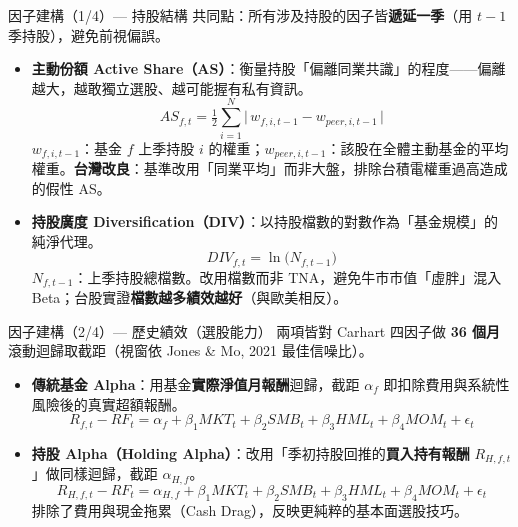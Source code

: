\documentclass[aspectratio=169,11pt,t]{beamer}   %
\begin{document}
\begin{frame}{因子建構（1/4）— 持股結構}
\vspace{-0.05cm}\small
共同點：所有涉及持股的因子皆\textbf{遞延一季}（用 $t{-}1$ 季持股），避免前視偏誤。
\begin{itemize}\setlength{\itemsep}{8pt}
  \item \textcolor{nccublue}{\textbf{主動份額 Active Share（AS）}}：衡量持股「偏離同業共識」的程度——偏離越大，越敢獨立選股、越可能握有私有資訊。
  \[ AS_{f,t}=\tfrac{1}{2}\sum_{i=1}^{N}\bigl|\,w_{f,i,t-1}-w_{peer,i,t-1}\,\bigr| \]
  {\footnotesize\color{softgray} $w_{f,i,t-1}$：基金 $f$ 上季持股 $i$ 的權重；$w_{peer,i,t-1}$：該股在全體主動基金的平均權重。\textbf{台灣改良}：基準改用「同業平均」而非大盤，排除台積電權重過高造成的假性 AS。}
  \item \textcolor{nccublue}{\textbf{持股廣度 Diversification（DIV）}}：以持股檔數的對數作為「基金規模」的純淨代理。
  \[ DIV_{f,t}=\ln\!\bigl(N_{f,t-1}\bigr) \]
  {\footnotesize\color{softgray} $N_{f,t-1}$：上季持股總檔數。改用檔數而非 TNA，避免牛市市值「虛胖」混入 Beta；台股實證\textbf{檔數越多績效越好}（與歐美相反）。}
\end{itemize}
\end{frame}

\begin{frame}{因子建構（2/4）— 歷史績效（選股能力）}
\vspace{0.0cm}\small
兩項皆對 Carhart 四因子做 \textbf{36 個月}滾動迴歸取截距（視窗依 Jones \& Mo, 2021 最佳信噪比）。
\begin{itemize}\setlength{\itemsep}{9pt}
  \item \textcolor{nccublue}{\textbf{傳統基金 Alpha}}：用基金\textbf{實際淨值月報酬}迴歸，截距 $\alpha_f$ 即扣除費用與系統性風險後的真實超額報酬。
  \[ R_{f,t}-RF_t=\alpha_f+\beta_1 MKT_t+\beta_2 SMB_t+\beta_3 HML_t+\beta_4 MOM_t+\epsilon_t \]
  \item \textcolor{nccublue}{\textbf{持股 Alpha（Holding Alpha）}}：改用「季初持股回推的\textbf{買入持有報酬} $R_{H,f,t}$」做同樣迴歸，截距 $\alpha_{H,f}$。
  \[ R_{H,f,t}-RF_t=\alpha_{H,f}+\beta_1 MKT_t+\beta_2 SMB_t+\beta_3 HML_t+\beta_4 MOM_t+\epsilon_t \]
  {\footnotesize\color{softgray} 排除了費用與現金拖累（Cash Drag），反映更純粹的基本面選股技巧。}
\end{itemize}
\end{frame}
\end{document}
